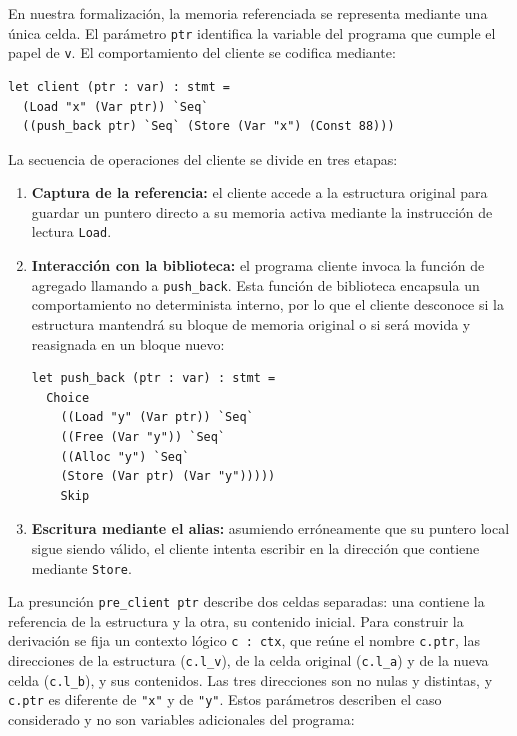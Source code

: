 \documentclass[a4paper,	11pt]{report}
\newif\ifdraft\drafttrue
\newcommand{\comm}[3]{\ifdraft{{\color{#1}[#2: #3]}}\fi}
\newcommand{\guido}[1]{\comm{blue}{Guido}{#1}}
\begin{document}
En nuestra formalización,
la memoria referenciada se representa mediante una única celda.
El parámetro \lstinline|ptr| identifica la variable del programa que cumple el papel de \lstinline|v|.
El comportamiento del cliente se codifica mediante:

\begin{lstlisting}
let client (ptr : var) : stmt =
  (Load "x" (Var ptr)) `Seq`
  ((push_back ptr) `Seq` (Store (Var "x") (Const 88)))
\end{lstlisting}

La secuencia de operaciones del cliente se divide en tres etapas:
\begin{enumerate}
  \item \textbf{Captura de la referencia:}
  el cliente accede a la estructura original para guardar un puntero directo a su memoria activa mediante la instrucción de lectura \lstinline|Load|.
  \item \textbf{Interacción con la biblioteca:}
  el programa cliente invoca la función de agregado llamando a \lstinline|push_back|.
  Esta función de biblioteca encapsula un comportamiento no determinista interno,
  por lo que el cliente desconoce si la estructura mantendrá su bloque de memoria original o si será movida y reasignada en un bloque nuevo:
\begin{lstlisting}
let push_back (ptr : var) : stmt =
  Choice
    ((Load "y" (Var ptr)) `Seq`
    ((Free (Var "y")) `Seq`
    ((Alloc "y") `Seq`
    (Store (Var ptr) (Var "y")))))
    Skip
\end{lstlisting}
  \item \textbf{Escritura mediante el alias:}
  asumiendo erróneamente que su puntero local sigue siendo válido,
  el cliente intenta escribir en la dirección que contiene mediante \lstinline|Store|.
\end{enumerate}

La presunción \lstinline|pre_client ptr| describe dos celdas separadas:
una contiene la referencia de la estructura y la otra,
su contenido inicial.
Para construir la derivación se fija un contexto lógico \lstinline|c : ctx|,
que reúne el nombre \lstinline|c.ptr|,
las direcciones de la estructura (\lstinline|c.l_v|),
de la celda original (\lstinline|c.l_a|) y de la nueva celda (\lstinline|c.l_b|),
y sus contenidos.
Las tres direcciones son no nulas y distintas,
y \lstinline|c.ptr| es diferente de \lstinline|"x"| y de \lstinline|"y"|.
Estos parámetros describen el caso considerado y no son variables adicionales del programa:
\end{document}
